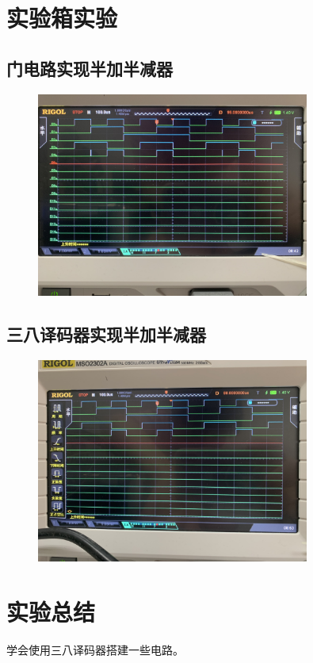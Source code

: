\documentclass[UTF8, a4paper, 11pt]{article}
\begin{document}
\section{实验箱实验}
\subsection{门电路实现半加半减器}
\begin{figure}[H]
    \centering
    \includegraphics[width=0.8\textwidth]{门.png}
\end{figure}
\subsection{三八译码器实现半加半减器}
\begin{figure}[H]
    \centering
    \includegraphics[width=0.8\textwidth]{三八.png}
\end{figure}
\section{实验总结}
学会使用三八译码器搭建一些电路。
%
%
\end{document}
